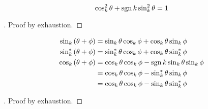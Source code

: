 \documentclass[stu, babel, american, biblatex, a4paper, leqno, draftall]{apa7}
\begin{document}
\begin{theorem}\label{M:Trigonometry:Pythagorean}
    \begin{equation*}
        \cos_k^2{\theta} +\operatorname{sgn}{k}\sin_k^2{\theta} = 1
    \end{equation*}
\end{theorem}
\begin{proof}[]
    Proof by exhaustion.
\end{proof}
\begin{proposition}\label{M:Trigonometry:Sum}
    \begin{align*}
        \sin_k\left(\theta+\phi\right)
        &= \sin_k{\theta}\cos_k{\phi}+\cos_k{\theta}\sin_k{\phi} \\
        \sin_k^\ast\left(\theta+\phi\right)
        &= \sin_k^\ast{\theta}\cos_k{\phi}+\cos_k{\theta}\sin_k^\ast{\phi} \\
        \cos_k\left(\theta+\phi\right)
        &= \cos_k{\theta}\cos_k{\phi}-\operatorname{sgn}{k}\sin_k{\theta}\sin_k{\phi} \\
        &= \cos_k{\theta}\cos_k{\phi}-\sin_k^\ast{\theta}\sin_k{\phi} \\
        &= \cos_k{\theta}\cos_k{\phi}-\sin_k{\theta}\sin_k^\ast{\phi} \\
    \end{align*}
\end{proposition}
\begin{proof}[]
    Proof by exhaustion.
\end{proof}
\end{document}
